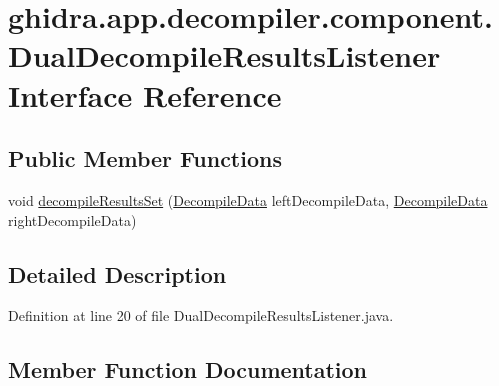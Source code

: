 \hypertarget{interfaceghidra_1_1app_1_1decompiler_1_1component_1_1_dual_decompile_results_listener}{}\section{ghidra.\+app.\+decompiler.\+component.\+Dual\+Decompile\+Results\+Listener Interface Reference}
\label{interfaceghidra_1_1app_1_1decompiler_1_1component_1_1_dual_decompile_results_listener}
\subsection*{Public Member Functions}
\begin{DoxyCompactItemize}
\item 
void \mbox{\hyperlink{interfaceghidra_1_1app_1_1decompiler_1_1component_1_1_dual_decompile_results_listener_a55cc3479eb9d590ce795430746b35882}{decompile\+Results\+Set}} (\mbox{\hyperlink{classghidra_1_1app_1_1decompiler_1_1component_1_1_decompile_data}{Decompile\+Data}} left\+Decompile\+Data, \mbox{\hyperlink{classghidra_1_1app_1_1decompiler_1_1component_1_1_decompile_data}{Decompile\+Data}} right\+Decompile\+Data)
\end{DoxyCompactItemize}


\subsection{Detailed Description}


Definition at line 20 of file Dual\+Decompile\+Results\+Listener.\+java.



\subsection{Member Function Documentation}
\mbox{\label{interfaceghidra_1_1app_1_1decompiler_1_1component_1_1_dual_decompile_results_listener_a55cc3479eb9d590ce795430746b35882}} 
